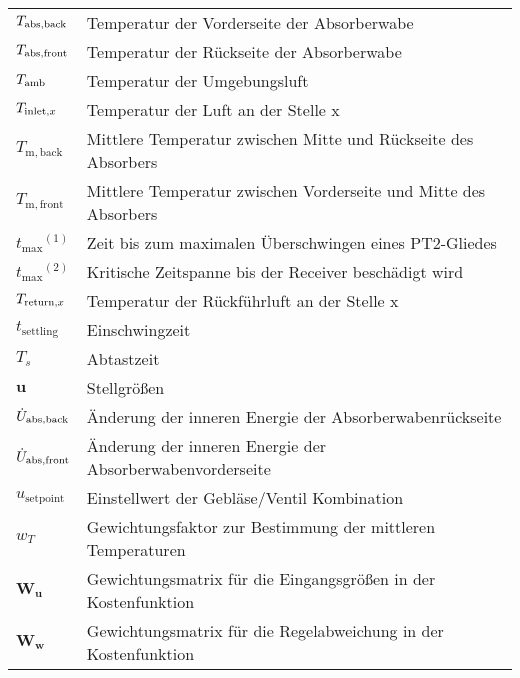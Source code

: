 \begin{longtable}{p{}p{}}
    $T_{\mathrm{abs,back}}$                 & Temperatur der Vorderseite der Absorberwabe                      \\
    $T_{\mathrm{abs,front}}$                & Temperatur der Rückseite der Absorberwabe                        \\
    $T_{\mathrm{amb}}$                      & Temperatur der Umgebungsluft                                     \\
    $T_{\mathrm{inlet,}x}$                     & Temperatur der Luft an der Stelle x                              \\
    $T_{\mathrm{m,back}}$            & Mittlere Temperatur zwischen Mitte und Rückseite des Absorbers   \\
    $T_{\mathrm{m,front}}$           & Mittlere Temperatur zwischen Vorderseite und Mitte des Absorbers \\
    ${t_{\mathrm{max}}}^{(1)}$       & Zeit bis zum maximalen Überschwingen eines PT2-Gliedes           \\
    ${t_{\mathrm{max}}}^{(2)}$       & Kritische Zeitspanne bis der Receiver beschädigt wird            \\
    $T_{\mathrm{return,}x}$                    & Temperatur der Rückführluft an der Stelle x                      \\
    $t_{\mathrm{settling}}$          & Einschwingzeit                                                   \\
    $T_s$                            & Abtastzeit                                                       \\
    $\boldsymbol{u}$                 & Stellgrößen                                                      \\
    $\dot{U}_{\mathrm{abs}, \mathrm{back}}$              & Änderung der inneren Energie der Absorberwabenrückseite          \\
    $\dot{U}_{\mathrm{abs}, \mathrm{front}}$             & Änderung der inneren Energie der Absorberwabenvorderseite        \\
    $u_{\mathrm{setpoint}}$          & Einstellwert der Gebläse/Ventil Kombination                      \\
    $w_T$                            & Gewichtungsfaktor zur Bestimmung der mittleren Temperaturen      \\
    $\boldsymbol{W_{u}}$             & Gewichtungsmatrix für die Eingangsgrößen in der Kostenfunktion   \\
    $\boldsymbol{W_{w}}$             & Gewichtungsmatrix für die Regelabweichung in der Kostenfunktion  \\

\end{longtable}
